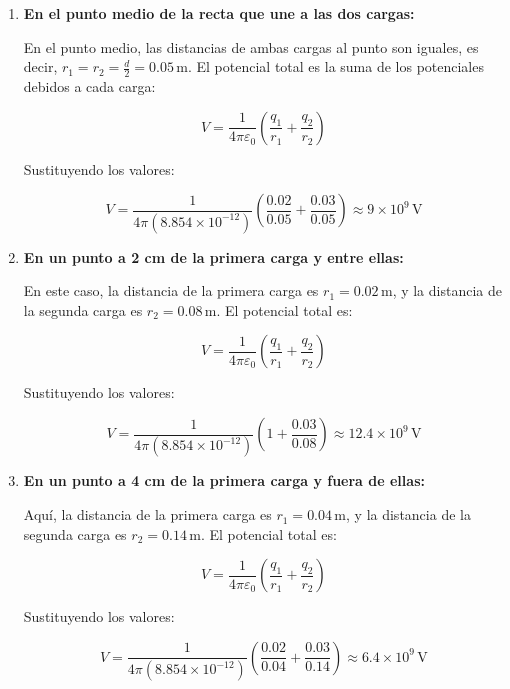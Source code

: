 \documentclass[answers]{exam} %
\begin{document}
\begin{questions}
	\vspace{0.5cm}

	\begin{enumerate}[label=\alph*)]
		\item \textbf{En el punto medio de la recta que une a las dos cargas:}

		      En el punto medio, las distancias de ambas cargas al punto son iguales, es decir, \( r_1 = r_2 = \frac{d}{2} = 0.05 \, \text{m} \). El potencial total es la suma de los potenciales debidos a cada carga:

		      \[
			      V = \frac{1}{4 \pi \varepsilon_0} \left( \frac{q_1}{r_1} + \frac{q_2}{r_2} \right)
		      \]

		      Sustituyendo los valores:

		      \[
			      V = \frac{1}{4 \pi (8.854 \times 10^{-12})} \left( \frac{0.02}{0.05} + \frac{0.03}{0.05} \right) \approx 9 \times 10^{9} \, \text{V}
		      \]

		\newpage
		\item \textbf{En un punto a 2 cm de la primera carga y entre ellas:}

		      En este caso, la distancia de la primera carga es \( r_1 = 0.02 \, \text{m} \), y la distancia de la segunda carga es \( r_2 = 0.08 \, \text{m} \). El potencial total es:

		      \[
			      V = \frac{1}{4 \pi \varepsilon_0} \left( \frac{q_1}{r_1} + \frac{q_2}{r_2} \right)
		      \]

		      Sustituyendo los valores:

		      \[
			      V = \frac{1}{4 \pi (8.854 \times 10^{-12})} \left( 1 + \frac{0.03}{0.08} \right) \approx 12.4 \times 10^{9} \, \text{V}
		      \]
		\vspace{1cm}

		\item \textbf{En un punto a 4 cm de la primera carga y fuera de ellas:}

		      Aquí, la distancia de la primera carga es \( r_1 = 0.04 \, \text{m} \), y la distancia de la segunda carga es \( r_2 = 0.14 \, \text{m} \). El potencial total es:

		      \[
			      V = \frac{1}{4 \pi \varepsilon_0} \left( \frac{q_1}{r_1} + \frac{q_2}{r_2} \right)
		      \]

		      Sustituyendo los valores:

		      \[
			      V = \frac{1}{4 \pi (8.854 \times 10^{-12})} \left( \frac{0.02}{0.04} + \frac{0.03}{0.14} \right) \approx 6.4 \times 10^{9} \, \text{V}
		      \]


\end{enumerate}
\end{questions}
\end{document}
